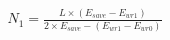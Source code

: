 \begin{equation}
    \label{eq:bit1num}
    \begin{split}
        N_{1} = \frac{L \times (E_{save} - E_{wr1})}{2\times E_{save} - (E_{wr1}-E_{wr0})}
    \end{split}
\end{equation}
\normalsize



